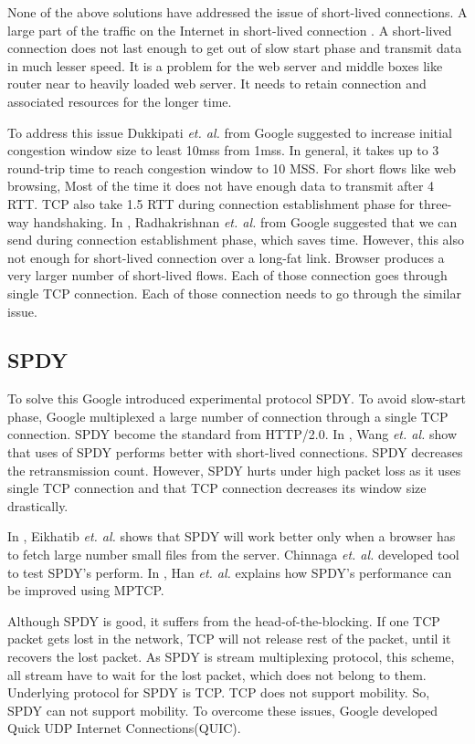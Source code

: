 None of the above solutions have addressed the issue of short-lived connections. A large part of the traffic on the Internet in short-lived connection \cite{kheirkhah2015short}. A short-lived connection does not last enough to get out of slow start phase and transmit data in much lesser speed. It is a problem for the web server and middle boxes like router near to heavily loaded web server. It needs to retain connection and associated resources for the longer time. 

To address this issue Dukkipati \textit{et. al.} from Google suggested to increase initial congestion window size to least 10mss\cite{google-long-initcwnd} from 1mss. In general, it takes up to 3 round-trip time to reach congestion window to 10 MSS. For short flows like web browsing, Most of the time it does not have enough data to transmit after 4 RTT. TCP also take 1.5 RTT during connection establishment phase for three-way handshaking. In \cite{google-fast-open}, Radhakrishnan \textit{et. al.} from Google suggested that we can send during connection establishment phase, which saves time. However, this also not enough for short-lived connection over a long-fat link. Browser produces a very larger number of short-lived flows. Each of those connection goes through single TCP connection. Each of those connection needs to go through the similar issue. 

\subsection{SPDY}
To solve this Google introduced experimental protocol SPDY\cite{spdy}. To avoid slow-start phase, Google multiplexed a large number of connection through a single TCP connection. SPDY become the standard from HTTP/2.0. In \cite{howspeedis}, Wang \textit{et. al.} show that uses of SPDY performs better with short-lived connections. SPDY decreases the retransmission count. However, SPDY hurts under high packet loss as it uses single TCP connection and that TCP connection decreases its window size drastically. 

In \cite{canspdymake}, Eikhatib \textit{et. al.} shows that SPDY will work better only when a browser has to fetch large number small files from the server. Chinnaga \textit{et. al.} developed tool to test SPDY's perform\cite{scalabilitySPDY}. In \cite{han2015anatomy}, Han \textit{et. al.} explains how SPDY's performance can be improved using MPTCP.

Although SPDY is good, it suffers from the head-of-the-blocking. If one TCP packet gets lost in the network, TCP will not release rest of the packet, until it recovers the lost packet. As SPDY is stream multiplexing protocol, this scheme, all stream have to wait for the lost packet, which does not belong to them. Underlying protocol for SPDY is TCP. TCP does not support mobility. So, SPDY can not support mobility. To overcome these issues, Google developed Quick UDP Internet Connections(QUIC).

